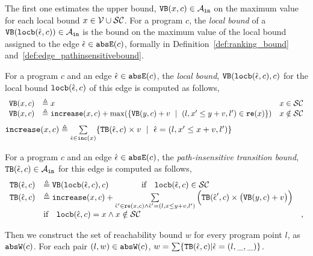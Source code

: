 \begin{enumerate}
The first one estimates the upper bound, ${\mathtt{VB}}(x, c) \in \mathcal{A}_{\mathtt{in}}$
on the maximum value for each local bound  $x \in  \mathcal{V} \cup \mathcal{SC}$.
For a program $c$, the \emph{local bound} of a
${\mathtt{VB}}(\mathtt{locb}(\hat{\mathtt{\epsilon}{}}, c)) \in \mathcal{A}_{\mathtt{in}}$ is 
the bound on the maximum value of the local bound 
assigned to the edge $\hat{\mathtt{\epsilon}{}} \in \mathtt{abs}{\mathtt{E}}(c)$, formally in Definition~\ref{def:ranking_bound} and~\ref{def:edge_pathinsensitivebound}.
\begin{defn}
  \label{def:ranking_bound}
For a program $c$ and an edge $\hat{\mathtt{\epsilon}{}} \in \mathtt{abs}{\mathtt{E}}(c)$,
the \emph{local bound}, ${\mathtt{VB}}(\mathtt{locb}(\hat{\mathtt{\epsilon}{}}, c), c)$ for the local bound $\mathtt{locb}(\hat{\mathtt{\epsilon}{}}, c)$
of this edge
is computed as follows,
  \[ 
\begin{array}{lll}
  {\ensuremath{\mathtt{VB}}}(x, c) & \triangleq x & x \in \mathcal{SC} \\
  {\mathtt{VB}}(x, c) & \triangleq \mathtt{increase}(x, c) + 
  \max(\{{\mathtt{VB}}(y, c) + v ~\mid~ (l, x' \leq y + v, l') \in \mathtt{re}(x)\}) & x \notin \mathcal{SC}
\end{array}
\]
%
$\mathtt{increase}(x, c) \triangleq \sum\limits_{\hat{\mathtt{\epsilon}{}} \in \mathtt{inc}(x)}\{{\mathtt{TB}}(\hat{\mathtt{\epsilon}{}}, c) \times v ~\mid~ 
\hat{\mathtt{\epsilon}{}} = (l, x' \leq x + v, l')\}$
\end{defn}

\begin{defn}
  \label{def:edge_pathinsensitivebound}
  For a program $c$ and an edge $\hat{\mathtt{\epsilon}{}} \in \mathtt{abs}{\mathtt{E}}(c)$, the \emph{path-insensitive transition bound},
  ${\mathtt{TB}}(\hat{\mathtt{\epsilon}{}}, c) \in \mathcal{A}_{\mathtt{in}}$ 
for this edge is
computed as follows,
\[ 
\begin{array}{lll}
  {\ensuremath{\mathtt{TB}}}(\hat{\mathtt{\epsilon}{}}, c) 
  & \triangleq {\ensuremath{\mathtt{VB}}}(\mathtt{locb}(\hat{\mathtt{\epsilon}{}}, c), c)   \qquad \qquad  \text{if} \quad  \mathtt{locb}(\hat{\mathtt{\epsilon}{}}, c) \in \mathcal{SC} & \\
  {\mathtt{TB}}(\hat{\mathtt{\epsilon}{}}, c) 
  & \triangleq \mathtt{increase}(x, c) 
   + 
  \sum\limits_{\hat{\mathtt{\epsilon}{}}' \in \mathtt{re}(x, c) \land \hat{\mathtt{\epsilon}{}}' = (l, x \leq y + v, l') }
  \Big( {\mathtt{TB}}(\hat{\mathtt{\epsilon}{}}', c) \times \big( {\mathtt{VB}}(y, c) + v \big) \Big)
  & \\
  &  \text{if} \quad  \mathtt{locb}(\hat{\mathtt{\epsilon}{}}, c) = x \land x \notin \mathcal{SC} & ,
\end{array}
  \]
\end{defn}
Then we construct the set of reachability bound $w$ for every program point $l$, as $\mathtt{abs}{\mathtt{W}}(c)$.
For each pair $(l, w) \in \mathtt{abs}{\mathtt{W}}(c)$, $w = \sum\left\{  \absclr(\absevent, c) \middle\vert \absevent = (l, \_, \_) \right\}$.


\end{enumerate}
